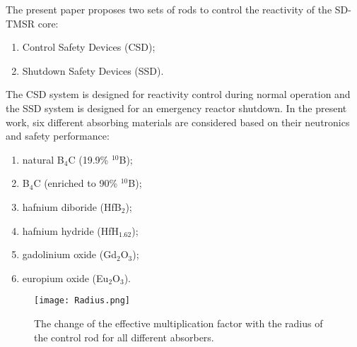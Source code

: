 The present paper proposes two sets of rods to control the reactivity of the SD-TMSR core:
\begin{enumerate}
\item Control Safety Devices (CSD);
\item Shutdown Safety Devices (SSD).
\end{enumerate}
The CSD system is designed for reactivity control during normal operation and the SSD system is designed for an emergency reactor shutdown.
In the present work, six different absorbing materials are considered based on their neutronics and safety performance:
\begin{enumerate}
\item natural B$_4$C (19.9\% $^{10}$B);
\item B$_4$C (enriched to 90\% $^{10}$B);
\item hafnium diboride (HfB$_2$);
\item hafnium hydride (HfH$_{1.62}$);
\item gadolinium oxide (Gd$_2$O$_3$);
\item europium oxide (Eu$_2$O$_3$).
\end{enumerate}

\begin{figure}[t!]  %
	\centering
	\hspace{+0.65in} 
	\texttt{[image: Radius.png]}
	\caption{The change of the effective multiplication factor with the radius of the control rod for all different absorbers.}
	\label{fig:Radius}
\end{figure}

